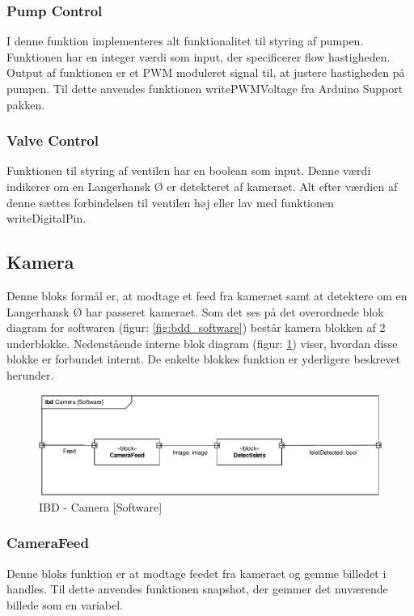 \subsubsection{Pump Control}
I denne funktion implementeres alt funktionalitet til styring af pumpen. Funktionen har en integer værdi som input, der specificerer flow hastigheden. Output af funktionen er et PWM moduleret signal til, at justere hastigheden på pumpen. Til dette anvendes funktionen writePWMVoltage fra Arduino Support pakken.
\subsubsection{Valve Control}
Funktionen til styring af ventilen har en boolean som input. Denne værdi indikerer om en Langerhansk Ø er detekteret af kameraet. Alt efter værdien af denne sættes forbindelsen til ventilen høj eller lav med funktionen writeDigitalPin. 

\newpage
\subsection{Kamera}
Denne bloks formål er, at modtage et feed fra kameraet samt at detektere om en Langerhansk Ø har passeret kameraet. Som det ses på det overordnede blok diagram for softwaren (figur: \ref{fig:bdd_software}) består kamera blokken af 2 underblokke. Nedenstående interne blok diagram (figur: \ref{fig:ibd_software_camera}) viser, hvordan disse blokke er forbundet internt. De enkelte blokkes funktion er yderligere beskrevet herunder.
\begin{figure}[H]
	\centering
	\includegraphics[width=1\textwidth]{billeder/IBD_Software_Kamera-crop.pdf}
	\caption{IBD - Camera [Software]}
	\label{fig:ibd_software_camera}
\end{figure}

\subsubsection{CameraFeed} \label{subsub:Dcamerafeed}
Denne bloks funktion er at modtage feedet fra kameraet og gemme billedet i handles. Til dette anvendes funktionen snapshot, der gemmer det nuværende billede som en variabel.  
